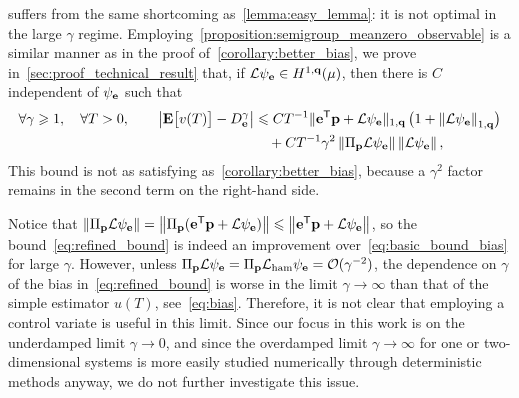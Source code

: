 \documentclass[11pt,a4paper]{article}
\begin{document}
 suffers from the same shortcoming as~\cref{lemma:easy_lemma}:
it is not optimal in the large $\gamma$ regime.
Employing~\cref{proposition:semigroup_meanzero_observable} is a similar manner as in the proof of~\cref{corollary:better_bias},
we prove in~\cref{sec:proof_technical_result} that,
if $\mathcal L \psi_{\boldsymbol{\mathbf e}} \in H^{1,\boldsymbol{\mathbf q}}(\mu)$,
then there is $C$ independent of $\psi_{\boldsymbol{\mathbf e}}$ such that
\begin{align}
    \notag
    \forall \gamma \geq 1, \quad
    \forall T > 0, \qquad
    \abs{\expect \bigl[ v(T) \bigr] - D_{\vect e}^{\gamma}}
        &\leq C T^{-1}
        \norm*{\vect e^\t \vect p +  \mathcal L \psi_{\vect e}}[1,\vect q] \, \bigl(1 + \norm{\mathcal L \psi_{\vect e}}[1,\vect q] \bigr) \\
        \label{eq:refined_bound}
        &\quad + C T^{-1} \gamma^2 \norm{\Pi_{\vect p} \mathcal L \psi_{\vect e}} \norm{\mathcal L \psi_{\vect e}},
\end{align}
This bound is not as satisfying as~\cref{corollary:better_bias},
because a $\gamma^2$ factor remains in the second term on the right-hand side.

    Notice that $\norm{\Pi_{\vect p} \mathcal L \psi_{\vect e}} = \norm{\Pi_{\vect p} (\vect e^\t \vect p + \mathcal L \psi_{\vect e})} \leq \norm{\vect e^\t \vect p + \mathcal L \psi_{\vect e}}$,
    so the bound~\eqref{eq:refined_bound} is indeed an improvement over~\eqref{eq:basic_bound_bias} for large $\gamma$.
    However,
    unless $\Pi_{\boldsymbol{\mathbf p}} \mathcal L \psi_{\boldsymbol{\mathbf e}} = \Pi_{\boldsymbol{\mathbf p}} \mathcal L_{\rm ham} \psi_{\boldsymbol{\mathbf e}} = \mathcal O(\gamma^{-2})$,
    the dependence on $\gamma$ of the bias in~\eqref{eq:refined_bound} is worse in the limit $\gamma \to \infty$
    than that of the simple estimator $u(T)$, see~\eqref{eq:bias}.
    Therefore, it is not clear that employing a control variate is useful in this limit.
    Since our focus in this work is on the underdamped limit $\gamma \to 0$,
    and since the overdamped limit $\gamma \to \infty$ for one or two-dimensional systems is more easily studied numerically through deterministic methods anyway,
    we do not further investigate this issue.
\end{document}
